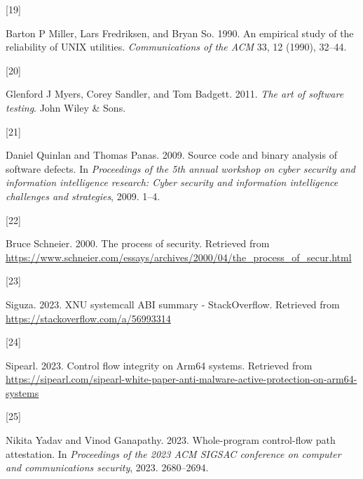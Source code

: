 \documentclass[a4paper, nobind]{templates/ociamthesis}
\newlength{\cslhangindent}
\newlength{\csllabelwidth}
\newenvironment{CSLReferences}[2] %
{\begin{list}{}{%
	\setlength{\itemindent}{0pt}
	\setlength{\leftmargin}{0pt}
	\setlength{\parsep}{0pt}
	\ifodd #1
	\setlength{\leftmargin}{\cslhangindent}
	\setlength{\itemindent}{-1\cslhangindent}
	\fi
	\setlength{\itemsep}{#2\baselineskip}}}
{\end{list}}
\newcommand{\CSLLeftMargin}[1]{\parbox[t]{\csllabelwidth}{\strut#1\strut}}
\newcommand{\CSLRightInline}[1]{\parbox[t]{\linewidth - \csllabelwidth}{\strut#1\strut}}
\begin{document}
\begin{CSLReferences}{0}{0}
\CSLLeftMargin{{[}19{]} }%
\CSLRightInline{Barton P Miller, Lars Fredriksen, and Bryan So. 1990. An empirical study of the reliability of UNIX utilities. \emph{Communications of the ACM} 33, 12 (1990), 32--44.}

\CSLLeftMargin{{[}20{]} }%
\CSLRightInline{Glenford J Myers, Corey Sandler, and Tom Badgett. 2011. \emph{The art of software testing}. John Wiley \& Sons.}

\CSLLeftMargin{{[}21{]} }%
\CSLRightInline{Daniel Quinlan and Thomas Panas. 2009. Source code and binary analysis of software defects. In \emph{Proceedings of the 5th annual workshop on cyber security and information intelligence research: Cyber security and information intelligence challenges and strategies}, 2009. 1--4.}

\CSLLeftMargin{{[}22{]} }%
\CSLRightInline{Bruce Schneier. 2000. The process of security. Retrieved from \url{https://www.schneier.com/essays/archives/2000/04/the_process_of_secur.html}}

\CSLLeftMargin{{[}23{]} }%
\CSLRightInline{Siguza. 2023. XNU systemcall ABI summary - StackOverflow. Retrieved from \url{https://stackoverflow.com/a/56993314}}

\CSLLeftMargin{{[}24{]} }%
\CSLRightInline{Sipearl. 2023. Control flow integrity on Arm64 systems. Retrieved from \url{https://sipearl.com/sipearl-white-paper-anti-malware-active-protection-on-arm64-systems}}

\CSLLeftMargin{{[}25{]} }%
\CSLRightInline{Nikita Yadav and Vinod Ganapathy. 2023. Whole-program control-flow path attestation. In \emph{Proceedings of the 2023 ACM SIGSAC conference on computer and communications security}, 2023. 2680--2694.}

\end{CSLReferences}

\end{document}

